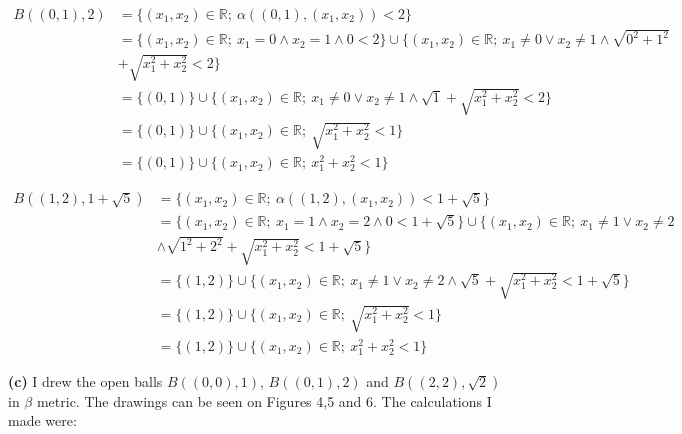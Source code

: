 \documentclass[12pt]{article}
\begin{document}
    \begin{align*} B((0,1), 2) &= \{(x_{1}, x_{2}) \in \mathbb{R}; \ \alpha((0,1),(x_{1}, x_{2}))<2\} \\
    	&= \{(x_{1}, x_{2}) \in \mathbb{R}; \ x_{1} = 0 \land x_{2} = 1 \land 0 < 2 \} \cup \{(x_{1}, x_{2}) \in \mathbb{R}; \ x_{1} \neq 0 \lor x_{2} \neq 1 \land \sqrt{0^2 + 1^2}  \\
    	&+ \sqrt{x_{1}^2 + x_{2}^2} < 2 \}\\
    	&= \{(0,1) \} \cup \{(x_{1}, x_{2}) \in \mathbb{R}; \ x_{1} \neq 0 \lor x_{2} \neq 1 \land \sqrt{1} + \sqrt{x_{1}^2 + x_{2}^2} < 2\} \\
    	&= \{(0,1) \} \cup \{(x_{1}, x_{2}) \in \mathbb{R}; \ \sqrt{x_{1}^2 + x_{2}^2} < 1\} \\
    	&= \{(0,1) \} \cup \{(x_{1}, x_{2}) \in \mathbb{R}; \ x_{1}^2 + x_{2}^2 < 1\}	
    \end{align*}

	\begin{align*} B((1,2), 1+\sqrt{5}) &= \{(x_{1}, x_{2}) \in \mathbb{R}; \ \alpha((1,2),(x_{1}, x_{2}))<1+\sqrt{5}\} \\
		&= \{(x_{1}, x_{2}) \in \mathbb{R}; \ x_{1} = 1 \land x_{2} = 2 \land 0 < 1 + \sqrt{5} \} \cup \{(x_{1}, x_{2}) \in \mathbb{R}; \ x_{1} \neq 1 \lor x_{2} \neq 2   \\
		&\land \sqrt{1^2 + 2^2} + \sqrt{x_{1}^2 + x_{2}^2} < 1 + \sqrt{5} \}\\
		&= \{(1,2) \} \cup \{(x_{1}, x_{2}) \in \mathbb{R}; \ x_{1} \neq 1 \lor x_{2} \neq 2 \land \sqrt{5} + \sqrt{x_{1}^2 + x_{2}^2} < 1 + \sqrt{5}\} \\
		&= \{(1,2) \} \cup \{(x_{1}, x_{2}) \in \mathbb{R}; \ \sqrt{x_{1}^2 + x_{2}^2} < 1\} \\
		&= \{(1,2) \} \cup \{(x_{1}, x_{2}) \in \mathbb{R}; \ x_{1}^2 + x_{2}^2 < 1\}	
	\end{align*}

	\textbf{(c)} I drew the open balls $B((0,0), 1)$, $B((0,1), 2)$ and $B((2,2), \sqrt{2})$ in $\beta$ metric. The drawings can be seen on Figures 4,5 and 6. The calculations I made were: 
	
\end{document}
